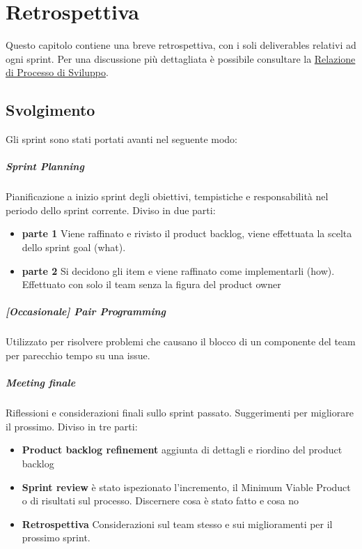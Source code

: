 \chapter{Retrospettiva} \label{chap:Retrospettiva}
Questo capitolo contiene una breve retrospettiva, con i soli deliverables relativi ad ogni sprint. Per una discussione più dettagliata è possibile consultare la \href{https://github.com/ISIQuiz/ISIQuiz-Report/releases/latest/download/process.pdf}{Relazione di Processo di Sviluppo}.

\section{Svolgimento}
Gli sprint sono stati portati avanti nel seguente modo:
    \paragraph{Sprint Planning}
        Pianificazione a inizio sprint degli obiettivi, tempistiche e responsabilità nel periodo dello sprint corrente. Diviso in due parti:
        \begin{itemize}
        \item\textbf{parte 1} 
            Viene raffinato e rivisto il product backlog, viene effettuata la scelta dello sprint goal (what).
        \item\textbf{parte 2}
            Si decidono gli item e viene raffinato come implementarli (how). Effettuato con solo il team senza la figura del product owner
        \end{itemize}
    \paragraph{[Occasionale] Pair Programming} Utilizzato per risolvere problemi che causano il blocco di un componente del team per parecchio tempo su una issue.
    \paragraph{Meeting finale}
        Riflessioni e considerazioni finali sullo sprint passato. Suggerimenti per migliorare il prossimo. Diviso in tre parti: 
        \begin{itemize}
        \item\textbf{Product backlog refinement} aggiunta di dettagli e riordino del product backlog
        \item\textbf{Sprint review} è stato ispezionato l'incremento, il Minimum Viable Product o di risultati sul processo. Discernere cosa è stato fatto e cosa no
        \item\textbf{Retrospettiva} Considerazioni sul team stesso e sui miglioramenti per il prossimo sprint. 
        \end{itemize}
